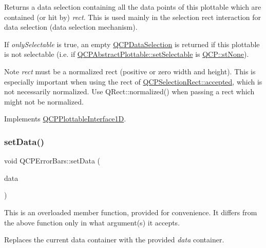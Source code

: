 Returns a data selection containing all the data points of this plottable which are contained (or hit by) {\itshape rect}. This is used mainly in the selection rect interaction for data selection (data selection mechanism).

If {\itshape only\+Selectable} is true, an empty \hyperlink{class_q_c_p_data_selection}{Q\+C\+P\+Data\+Selection} is returned if this plottable is not selectable (i.\+e. if \hyperlink{class_q_c_p_abstract_plottable_ac238d6e910f976f1f30d41c2bca44ac3}{Q\+C\+P\+Abstract\+Plottable\+::set\+Selectable} is \hyperlink{namespace_q_c_p_ac6cb9db26a564b27feda362a438db038aa64628e338a2dd1e6f0dc84dec0b63fe}{Q\+C\+P\+::st\+None}).

\begin{DoxyNote}{Note}
{\itshape rect} must be a normalized rect (positive or zero width and height). This is especially important when using the rect of \hyperlink{class_q_c_p_selection_rect_a15a43542e1f7b953a44c260b419e6d2c}{Q\+C\+P\+Selection\+Rect\+::accepted}, which is not necessarily normalized. Use {\ttfamily Q\+Rect\+::normalized()} when passing a rect which might not be normalized. 
\end{DoxyNote}


Implements \hyperlink{class_q_c_p_plottable_interface1_d_a67093e4ccf490ff5f7750640941ff34c}{Q\+C\+P\+Plottable\+Interface1D}.

\mbox{\label{class_q_c_p_error_bars_a92b1980003255f5f7c05407a4d92aabc}} 
\subsubsection{\texorpdfstring{set\+Data()}{setData()}\hspace{0.1cm}{\footnotesize\ttfamily [1/3]}}
{\footnotesize\ttfamily void Q\+C\+P\+Error\+Bars\+::set\+Data (\begin{DoxyParamCaption}\item[{Q\+Shared\+Pointer$<$ Q\+C\+P\+Error\+Bars\+Data\+Container $>$}]{data }\end{DoxyParamCaption})}

This is an overloaded member function, provided for convenience. It differs from the above function only in what argument(s) it accepts.

Replaces the current data container with the provided {\itshape data} container.

